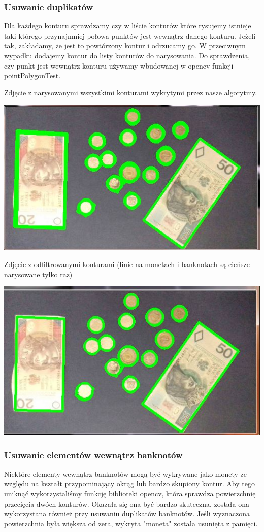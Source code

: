 \documentclass[12pt]{article}
\begin{document}
\newpage
\subsubsection*{Usuwanie duplikatów}
Dla każdego konturu sprawdzamy czy w liście konturów które rysujemy istnieje taki którego przynajmniej połowa punktów jest wewnątrz danego konturu. Jeżeli tak, zakładamy, że jest to powtórzony kontur i odrzucamy go. W przeciwnym wypadku dodajemy kontur do listy konturów do narysowania.
Do sprawdzenia, czy punkt jest wewnątrz konturu używamy wbudowanej w opencv funkcji pointPolygonTest.

Zdjęcie z narysowanymi wszystkimi konturami wykrytymi przez nasze algorytmy.

\includegraphics[scale=0.8]{wszystkie}

Zdjęcie z odfiltrowanymi konturami (linie na monetach i banknotach są cieńsze - narysowane tylko raz)

\includegraphics[scale=0.8]{filtrowane}

\newpage
\subsubsection*{Usuwanie elementów wewnątrz banknotów}
Niektóre elementy wewnątrz banknotów mogą być wykrywane jako monety ze względu na kształt przypominający okrąg lub bardzo skupiony kontur. Aby tego uniknąć wykorzystaliśmy funkcję biblioteki opencv, która sprawdza powierzchnię przecięcia dwóch konturów. Okazała się ona być bardzo skuteczna, została ona wykorzystana również przy usuwaniu duplikatów banknotów. Jeśli wyznaczona powierzchnia była większa od zera, wykryta "moneta" została usunięta z pamięci.
\end{document}
